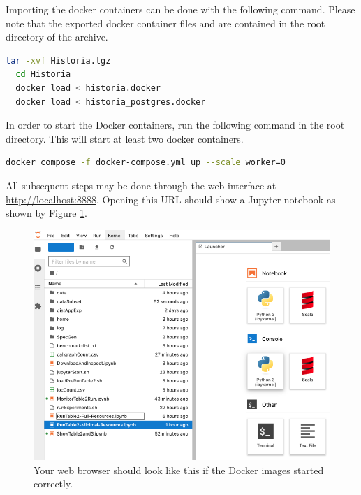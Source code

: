 \documentclass{acmart} %
\begin{document}
Importing the docker containers can be done with the following command. Please note that the exported docker container files  and  are contained in the root directory of the archive.

\begin{lstlisting}[language=bash]
  tar -xvf Historia.tgz
  cd Historia
  docker load < historia.docker
  docker load < historia_postgres.docker
\end{lstlisting}

In order to start the Docker containers, run the following command in the root directory.  This will start at least two docker containers.%

\begin{lstlisting}[language=bash]
 docker compose -f docker-compose.yml up --scale worker=0
\end{lstlisting}

All subsequent steps may be done through the web interface at \url{http://localhost:8888}.  Opening this URL should show a Jupyter notebook as shown by Figure \ref{fig:jupyter}.  

\begin{figure}[H]
    \includegraphics*[scale=0.35]{jupyter.png}
    \caption{Your web browser should look like this if the Docker images started correctly.}
    \label{fig:jupyter}
\end{figure}
\end{document}
